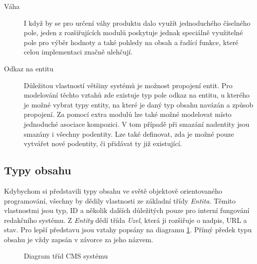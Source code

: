 \begin{description}
  \item[Váha] I když by se pro určení váhy produktu dalo využít jednoduchého číselného pole, jeden z rozšiřujících modulů poskytuje jednak speciálně využitelné pole pro výběr hodnoty a také pohledy na obsah a řadící funkce, které celou implementaci značně ulehčují.
  
  \item[Odkaz na entitu] Důležitou vlastností většiny systémů je možnost propojení entit. Pro modelování těchto vztahů zde existuje typ pole odkaz na entitu, u kterého je možné vybrat typy entity, na které je daný typ obsahu navázán a způsob propojení. Za pomocí extra modulů lze také možné modelovat místo jednoduché asociace kompozici. V tom případě při smazání nadentity jsou smazány i všechny podentity. Lze také definovat, zda je možné pouze vytvářet nové podentity, či přidávat ty již existující.
\end{description}

\subsection{Typy obsahu}
Kdybychom si představili typy obsahu ve světě objektově orientovaného programování, všechny by dědily vlastnosti ze základní třídy \emph{Entita}. Těmito vlastnostmi jsou typ, ID a několik dalších důležitých pouze pro interní fungování redakčního systému. Z \emph{Entity} dědí třída \emph{Uzel}, která ji rozšiřuje o nadpis, URL a stav. Pro lepší představu jsou vztahy popsány na diagramu \ref{fig:class-diagram}. Přímý předek typu obsahu je vždy zapsán v závorce za jeho názvem.

\begin{figure}[htp] 
\caption{Diagram tříd CMS systému}
\label{fig:class-diagram}
\end{figure}  

